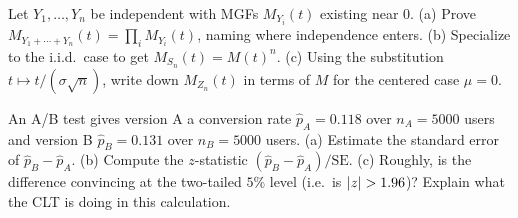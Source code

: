 \begin{exercise}
\label{ch21:ex-proof-mgf}
Let $Y_1, \dots, Y_n$ be independent with MGFs $M_{Y_i}(t)$ existing near $0$. (a) Prove
$M_{Y_1 + \cdots + Y_n}(t) = \prod_i M_{Y_i}(t)$, naming where independence enters.
(b) Specialize to the i.i.d.\ case to get $M_{S_n}(t) = M(t)^n$. (c) Using the
substitution $t \mapsto t/(\sigma\sqrt n)$, write down $M_{Z_n}(t)$ in terms of $M$ for
the centered case $\mu = 0$.
\end{exercise}

\begin{exercise}
\label{ch21:ex-twosample}
An A/B test gives version A a conversion rate $\hat p_A = 0.118$ over $n_A = 5000$ users
and version B $\hat p_B = 0.131$ over $n_B = 5000$ users. (a) Estimate the standard error
of $\hat p_B - \hat p_A$. (b) Compute the $z$-statistic
$(\hat p_B - \hat p_A)/\text{SE}$. (c) Roughly, is the difference convincing at the
two-tailed $5\%$ level (i.e.\ is $\lvert z\rvert > 1.96$)? Explain what the CLT is doing in
this calculation.
\end{exercise}
